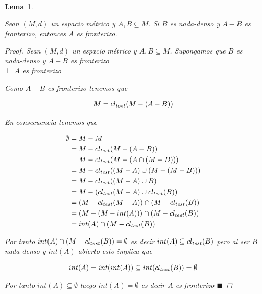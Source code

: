 \documentclass[oneside]{book} %
\theoremstyle{Teorema}
\newtheorem{Lema}[Definicion]{Lema}
\theoremstyle{Ejemplos}
\theoremstyle{[Obs]}
\def \test {test}
\newcommand{\cerradura}[2][\test]{\ifx \test #1 {\overline{#2}} \else {cl_{#1}(#2)} \fi} %
\renewcommand{\{}{\left\lbrace} %
\renewcommand{\}}{\right\rbrace} %
\renewcommand{\u}{\cup} %
\newcommand{\n}{\cap} %
\renewcommand{\sc}{\subseteq} %
\renewcommand{\qed}{$\blacksquare$} %
\newcommand{\pd}{$\vdash\ $} %
\begin{document}
			\begin{Lema}\label{Lema: Resta fronteriza y negativo nada-denso implican que positivo es fronterizo}\setlength{\parindent}{0em}
				
				Sean $(M, d)$ un espacio métrico y $A, B \sc M$. Si $B$ es nada-denso y $A - B$ es fronterizo, entonces $A$ es fronterizo.
				
				\begin{proof}
					
					Sean $(M, d)$ un espacio métrico y $A, B \sc M$. Supongamos que $B$ es nada-denso y $A - B$ es fronterizo \\ 
					\pd $A$ es fronterizo 

					Como $A - B$ es fronterizo tenemos que 

					\[ M = \cerradura{M - (A - B)} \]

					En consecuencia tenemos que 

					\begin{align*}
						\emptyset &= M - M \\
						&= M - \cerradura{M - (A - B)} \\ 
						&= M - \cerradura{M - (A \n (M - B))} \\ 
						&= M - \cerradura{(M - A) \u (M - (M - B))} \\ 
						&= M - \cerradura{(M - A) \u B} \\ 
						&= M - (\cerradura{M - A} \u \cerradura{B}) \\ 
						&= (M - \cerradura{M - A}) \n (M - \cerradura{B}) \\
						&= (M - (M - int(A))) \n (M - \cerradura{B}) \\ 
						&= int(A) \n (M - \cerradura{B}) 
					\end{align*}

					Por tanto $int(A) \n (M - \cerradura{B}) = \emptyset$ es decir $int(A) \sc \cerradura{B}$ pero al ser $B$ nada-denso y $int(A)$ abierto esto implica que

					\[ int(A) = int(int(A)) \sc int(\cerradura{B}) = \emptyset \]

					Por tanto $int(A) \sc \emptyset$ luego $int(A) = \emptyset$ es decir $A$ es fronterizo \qed

				\end{proof}

			\end{Lema}
\end{document}
